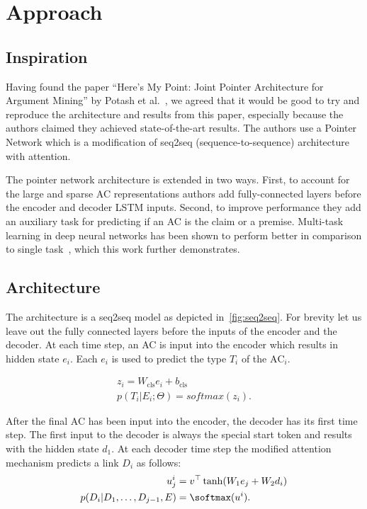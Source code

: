 \documentclass[onecolumn]{article}
\begin{document}
\section{Approach}
\subsection{Inspiration}
Having found the paper ``Here's My Point: Joint Pointer Architecture for Argument Mining'' by Potash et al.~\cite{potash2017here}, we agreed that it
would be good to try and reproduce the architecture and results from this paper, especially because the authors claimed they achieved
state-of-the-art results. The authors use a Pointer Network which is a modification of seq2seq (sequence-to-sequence) architecture with attention.

The pointer network architecture is extended in two ways.
First, to account for the large and sparse AC representations authors add fully-connected layers before the encoder and decoder LSTM inputs.
Second, to improve performance they add an auxiliary task for predicting if an AC is the claim or a premise.
Multi-task learning in deep neural networks has been shown to perform better in comparison to single task~\cite{multi}, which this work further demonstrates.

\subsection{Architecture}
The architecture is a seq2seq model as depicted in~\autoref{fig:seq2seq}.
For brevity let us leave out the fully connected layers before the inputs of the encoder and the decoder.
At each time step, an AC is input into the encoder which results in hidden state $e_i$.
Each $e_i$ is used to predict the type $T_i$ of the $\text{AC}_i$.

\begin{align*}
    z_i = W_{\text{cls}} e_i + b_{\text{cls}}\\
    p(T_i|E_i;\Theta) = softmax(z_i).
\end{align*}


After the final AC has been input into the encoder, the decoder has its first time step.
The first input to the decoder is always the special start token and results with the hidden state $d_1$.
At each decoder time step the modified attention mechanism predicts a link $D_i$ as follows:
\begin{align*}
    u_j^i &= v^\top \tanh(W_1e_j + W_2d_i)\\
    p(D_i|D_1,\dots,D_{j-1},E) &= \softmax(u^i).
\end{align*}
\end{document}
